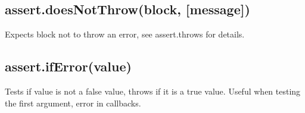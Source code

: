 \subsection*{assert.\+does\+Not\+Throw(block, \mbox{[}message\mbox{]})}

Expects block not to throw an error, see assert.\+throws for details.

\subsection*{assert.\+if\+Error(value)}

Tests if value is not a false value, throws if it is a true value. Useful when testing the first argument, error in callbacks. 